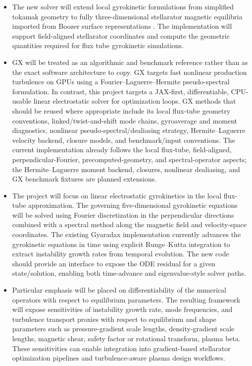 \documentclass[11pt,a4paper,oneside]{article}
\begin{document}
\begin{itemize}
    \item The new solver will extend local gyrokinetic formulations from simplified tokamak geometry to fully three-dimensional stellarator magnetic equilibria imported from Boozer surface representations \cite{simsopt}. The implementation will support field-aligned stellarator coordinates and compute the geometric quantities required for flux tube gyrokinetic simulations.
    \item GX will be treated as an algorithmic and benchmark reference rather than as the exact software architecture to copy. GX targets fast nonlinear production turbulence on GPUs using a Fourier--Laguerre--Hermite pseudo-spectral formulation. In contrast, this project targets a JAX-first, differentiable, CPU-usable linear electrostatic solver for optimization loops. GX methods that should be reused where appropriate include its local flux-tube geometry conventions, linked/twist-and-shift mode chains, gyroaverage and moment diagnostics, nonlinear pseudo-spectral/dealiasing strategy, Hermite--Laguerre velocity backend, closure models, and benchmark/input conventions. The current implementation already follows the local flux-tube, field-aligned, perpendicular-Fourier, precomputed-geometry, and spectral-operator aspects; the Hermite--Laguerre moment backend, closures, nonlinear dealiasing, and GX benchmark fixtures are planned extensions.
    \item The project will focus on linear electrostatic gyrokinetics in the local flux-tube approximation. The governing five-dimensional gyrokinetic equations will be solved using Fourier discretization in the perpendicular directions combined with a spectral method along the magnetic field and velocity-space coordinates. The existing Gyaradax implementation currently advances the gyrokinetic equations in time using explicit Runge--Kutta integration to extract instability growth rates from temporal evolution. The new code should provide an interface to expose the ODE residual for a given state/solution, enabling both time-advance and eigenvalue-style solver paths.
    \item Particular emphasis will be placed on differentiability of the numerical operators with respect to equilibrium parameters. The resulting framework will expose sensitivities of instability growth rate, mode frequencies, and turbulence transport proxies with respect to equilibrium and shape parameters such as pressure-gradient scale lengths, density-gradient scale lengths, magnetic shear, safety factor or rotational transform, plasma beta. These sensitivities can enable integration into gradient-based stellarator optimization pipelines and turbulence-aware plasma design workflows.

\end{itemize}
\end{document}
